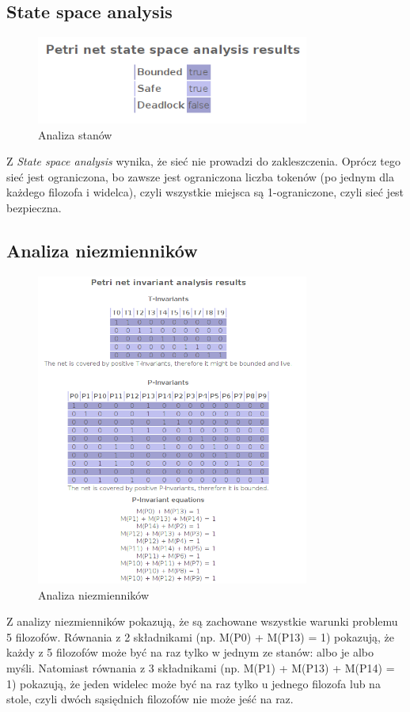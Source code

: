 \documentclass{article}
\begin{document}
\subsection{State space analysis}
\begin{figure}[H]
    \centering
    \includegraphics[width=0.8\textwidth, height=0.4\textheight]{zad8_stany.png}
    \caption{Analiza stanów}
\end{figure}

Z \textit{State space analysis} wynika, że sieć nie prowadzi do zakleszczenia. Oprócz tego sieć jest ograniczona,
bo zawsze jest ograniczona liczba tokenów (po jednym dla każdego filozofa i widelca), czyli wszystkie miejsca są 
1-ograniczone, czyli sieć jest bezpieczna.

\subsection{Analiza niezmienników}
\begin{figure}[H]
    \centering
    \includegraphics[width=0.8\textwidth, height=0.9\textheight]{zad8_analiza.png}
    \caption{Analiza niezmienników}
\end{figure}

Z analizy niezmienników pokazują, że są zachowane wszystkie warunki problemu 5 filozofów.
Równania z 2 składnikami (np. M(P0) + M(P13) = 1) pokazują, że każdy z 5 filozofów może być na raz tylko w jednym ze stanów:
albo je albo myśli. Natomiast równania z 3 składnikami (np. M(P1) + M(P13) + M(P14) = 1) 
pokazują, że jeden widelec może być na raz tylko u jednego filozofa lub na stole, czyli dwóch sąsiędnich filozofów nie może jeść na raz.
\end{document}
